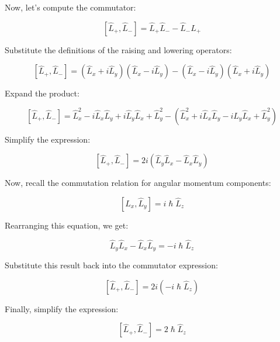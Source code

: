 \documentclass{article}
\begin{document}
Now, let's compute the commutator:

$$[\hat{L}_+, \hat{L}_-] = \hat{L}_+ \hat{L}_- - \hat{L}_- \hat{L}_+$$

Substitute the definitions of the raising and lowering operators:

$$[\hat{L}_+, \hat{L}_-] = (\hat{L}_x + i \hat{L}_y)(\hat{L}_x - i \hat{L}_y) - (\hat{L}_x - i \hat{L}_y)(\hat{L}_x + i \hat{L}_y)$$

Expand the product:

$$[\hat{L}_+, \hat{L}_-] = \hat{L}_x^2 - i \hat{L}_x \hat{L}_y + i \hat{L}_y \hat{L}_x + \hat{L}_y^2 - (\hat{L}_x^2 + i \hat{L}_x \hat{L}_y - i \hat{L}_y \hat{L}_x + \hat{L}_y^2)$$

Simplify the expression:

$$[\hat{L}_+, \hat{L}_-] = 2i(\hat{L}_y \hat{L}_x - \hat{L}_x \hat{L}_y)$$

Now, recall the commutation relation for angular momentum components:

$$[\hat{L}_x, \hat{L}_y] = i \hslash \hat{L}_z$$

Rearranging this equation, we get:

$$\hat{L}_y \hat{L}_x - \hat{L}_x \hat{L}_y = -i \hslash \hat{L}_z$$

Substitute this result back into the commutator expression:

$$[\hat{L}_+, \hat{L}_-] = 2i(-i \hslash \hat{L}_z)$$

Finally, simplify the expression:

$$[\hat{L}_+, \hat{L}_-] = 2 \hslash \hat{L}_z$$
\end{document}
